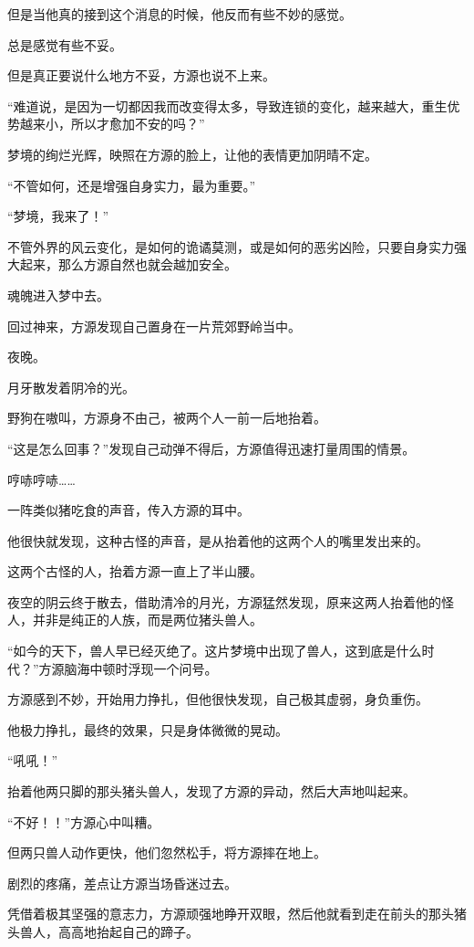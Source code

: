 \begin{this_body}
但是当他真的接到这个消息的时候，他反而有些不妙的感觉。

总是感觉有些不妥。

但是真正要说什么地方不妥，方源也说不上来。

“难道说，是因为一切都因我而改变得太多，导致连锁的变化，越来越大，重生优势越来小，所以才愈加不安的吗？”

梦境的绚烂光辉，映照在方源的脸上，让他的表情更加阴晴不定。

“不管如何，还是增强自身实力，最为重要。”

“梦境，我来了！”

不管外界的风云变化，是如何的诡谲莫测，或是如何的恶劣凶险，只要自身实力强大起来，那么方源自然也就会越加安全。

魂魄进入梦中去。

回过神来，方源发现自己置身在一片荒郊野岭当中。

夜晚。

月牙散发着阴冷的光。

野狗在嗷叫，方源身不由己，被两个人一前一后地抬着。

“这是怎么回事？”发现自己动弹不得后，方源值得迅速打量周围的情景。

哼哧哼哧……

一阵类似猪吃食的声音，传入方源的耳中。

他很快就发现，这种古怪的声音，是从抬着他的这两个人的嘴里发出来的。

这两个古怪的人，抬着方源一直上了半山腰。

夜空的阴云终于散去，借助清冷的月光，方源猛然发现，原来这两人抬着他的怪人，并非是纯正的人族，而是两位猪头兽人。

“如今的天下，兽人早已经灭绝了。这片梦境中出现了兽人，这到底是什么时代？”方源脑海中顿时浮现一个问号。

方源感到不妙，开始用力挣扎，但他很快发现，自己极其虚弱，身负重伤。

他极力挣扎，最终的效果，只是身体微微的晃动。

“吼吼！”

抬着他两只脚的那头猪头兽人，发现了方源的异动，然后大声地叫起来。

“不好！！”方源心中叫糟。

但两只兽人动作更快，他们忽然松手，将方源摔在地上。

剧烈的疼痛，差点让方源当场昏迷过去。

凭借着极其坚强的意志力，方源顽强地睁开双眼，然后他就看到走在前头的那头猪头兽人，高高地抬起自己的蹄子。


\end{this_body}
